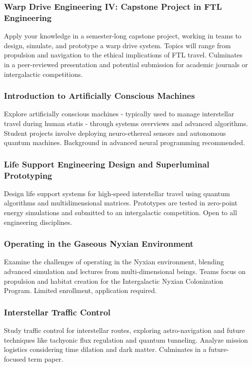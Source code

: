 \subsubsection{Warp Drive Engineering IV: Capstone Project in FTL Engineering}
Apply your knowledge in a semester-long capstone project, working in teams to design, simulate, and prototype a warp drive system. Topics will range from propulsion and navigation to the ethical implications of FTL travel. Culminates in a peer-reviewed presentation and potential submission for academic journals or intergalactic competitions.
\subsubsection{Introduction to Artificially Conscious Machines}
Explore artificially conscious machines - typically used to manage interstellar travel during human statis - through systems overviews and advanced algorithms. Student projects involve deploying neuro-ethereal sensors and autonomous quantum machines. Background in advanced neural programming recommended.
\subsubsection{Life Support Engineering Design and Superluminal Prototyping}
Design life support systems for high-speed interstellar travel using quantum algorithms and multidimensional matrices. Prototypes are tested in zero-point energy simulations and submitted to an intergalactic competition. Open to all engineering disciplines.
\subsubsection{Operating in the Gaseous Nyxian Environment}
Examine the challenges of operating in the Nyxian environment, blending advanced simulation and lectures from multi-dimensional beings. Teams focus on propulsion and habitat creation for the Intergalactic Nyxian Colonization Program. Limited enrollment, application required.
\subsubsection{Interstellar Traffic Control}
Study traffic control for interstellar routes, exploring astro-navigation and future techniques like tachyonic flux regulation and quantum tunneling. Analyze mission logistics considering time dilation and dark matter. Culminates in a future-focused term paper.


